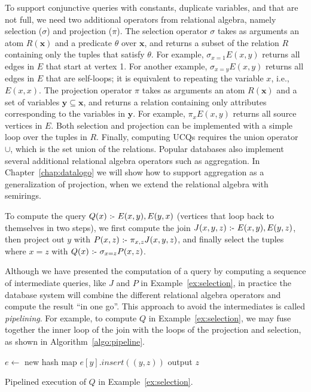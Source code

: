 To support conjunctive queries with constants, 
 duplicate variables, and that are not full,
 we need two additional operators from relational algebra, 
 namely selection ($\sigma$) and projection ($\pi$).
The selection operator $\sigma$ takes as arguments an atom $R({\bm x})$
 and a predicate $\theta$ over ${\bm x}$,
 and returns a subset of the relation $R$ containing only the tuples that satisfy $\theta$.
For example, $\sigma_{x = 1}E(x, y)$ returns all edges in $E$ that start at vertex 1.
For another example, $\sigma_{x = y}E(x, y)$ returns all edges in $E$ that are self-loops;
 it is equivalent to repeating the variable $x$, i.e., $E(x, x)$.
The projection operator $\pi$ takes as arguments an atom $R({\bm x})$
 and a set of variables ${\bm y} \subseteq {\bm x}$,
 and returns a relation containing only attributes corresponding 
 to the variables in ${\bm y}$.
For example, $\pi_{x}E(x, y)$ returns all source vertices in $E$.
Both selection and projection can be implemented with a simple loop over the tuples in $R$.
Finally, computing UCQs requires the union operator $\cup$,
 which is the set union of the relations.
Popular databases also implement several additional relational algebra operators 
 such as aggregation.
In Chapter~\ref{chap:datalogo} we will show how to support aggregation
 as a generalization of projection, 
 when we extend the relational algebra with semirings.

\begin{ex}
\label{ex:selection}
To compute the query $Q(x) \text{ :- } E(x, y), E(y, x)$ 
 (vertices that loop back to themselves in two steps),
 we first compute the join $J(x, y, z) \text{ :- } E(x, y), E(y, z)$, 
 then project out $y$ with $P(x, z) \text{ :- } \pi_{x, z} J(x, y, z)$,
 and finally select the tuples where $x = z$ with $Q(x) \text{ :- } \sigma_{x=z} P(x, z)$.
\end{ex}
 
Although we have presented the computation of a query 
 by computing a sequence of intermediate queries, 
 like $J$ and $P$ in Example~\ref{ex:selection},
 in practice the database system will combine
 the different relational algebra operators 
 and compute the result ``in one go''.
This approach to avoid the intermediates 
 is called {\em pipelining}.
For example, to compute $Q$ in Example~\ref{ex:selection},
 we may fuse together the inner loop of the join
 with the loops of the projection and selection, 
 as shown in Algorithm~\ref{algo:pipeline}.

\begin{algorithm}
$e \gets $ new hash map \;
{
    $e[y].insert((y, z))$\;
}
{
    {
        {
            output $z$\;
        }
    }
}
\caption{Pipelined execution of $Q$ in Example~\ref{ex:selection}.}
\label{algo:pipeline} 
\end{algorithm}

